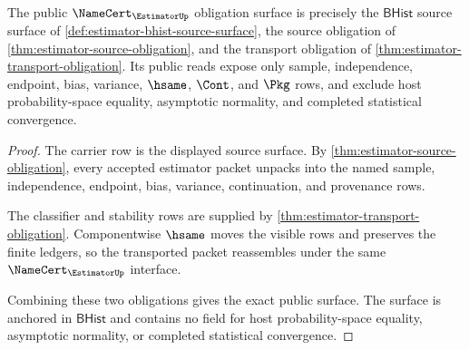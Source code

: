 \begin{theorem}
\label{thm:estimator-namecert-obligation-surface}
The public $\NameCert_{\EstimatorUp}$ obligation surface is precisely the
$\mathsf{BHist}$ source surface of
\autoref{def:estimator-bhist-source-surface}, the source obligation of
\autoref{thm:estimator-source-obligation}, and the transport obligation of
\autoref{thm:estimator-transport-obligation}. Its public reads expose only
sample, independence, endpoint, bias, variance, $\hsame$, $\Cont$, and $\Pkg$
rows, and exclude host probability-space equality, asymptotic normality, and
completed statistical convergence.
\end{theorem}
\begin{proof}
The carrier row is the displayed source surface. By
\autoref{thm:estimator-source-obligation}, every accepted estimator packet
unpacks into the named sample, independence, endpoint, bias, variance,
continuation, and provenance rows.

The classifier and stability rows are supplied by
\autoref{thm:estimator-transport-obligation}. Componentwise $\hsame$ moves the
visible rows and preserves the finite ledgers, so the transported packet
reassembles under the same $\NameCert_{\EstimatorUp}$ interface.

Combining these two obligations gives the exact public surface. The surface is
anchored in $\mathsf{BHist}$ and contains no field for host probability-space
equality, asymptotic normality, or completed statistical convergence.
\end{proof}

